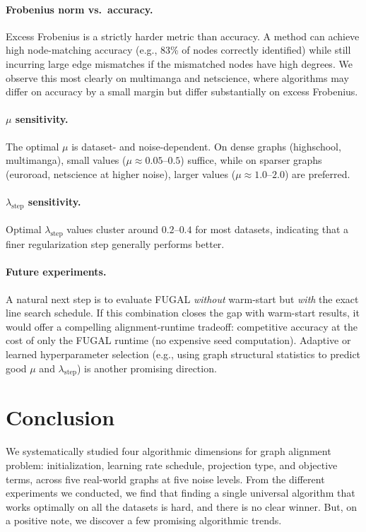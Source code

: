 \documentclass[11pt,a4paper]{article}
\newcommand{\muval}{\mu}
\newcommand{\lams}{\lambda_{\text{step}}}
\begin{document}
\paragraph{Frobenius norm vs.\ accuracy.}
Excess Frobenius is a strictly harder metric than accuracy.  A method can achieve high node-matching accuracy (e.g., 83\% of nodes correctly identified) while still incurring large edge mismatches if the mismatched nodes have high degrees. We observe this most clearly on multimanga and netscience, where algorithms may differ on accuracy by a small margin but differ substantially on excess Frobenius.

\paragraph{$\muval$ sensitivity.}
The optimal $\muval$ is dataset- and noise-dependent.  On dense graphs (highschool, multimanga), small values ($\muval \approx 0.05$--$0.5$) suffice, while on sparser graphs (euroroad, netscience at higher noise), larger values ($\muval \approx 1.0$--$2.0$) are preferred.

\paragraph{$\lams$ sensitivity.}
Optimal $\lams$ values cluster around $0.2$--$0.4$ for most datasets, indicating that a finer regularization step generally performs better.

\paragraph{Future experiments.}
A natural next step is to evaluate FUGAL \emph{without} warm-start but \emph{with} the exact line search schedule.  If this combination closes the gap with warm-start results, it would offer a compelling alignment-runtime tradeoff: competitive accuracy at the cost of only the FUGAL runtime (no expensive seed computation).  Adaptive or learned hyperparameter selection (e.g., using graph structural statistics to predict good $\muval$ and $\lams$) is another promising direction.

\section{Conclusion}
\label{sec:conclusion}

We systematically studied four algorithmic dimensions for graph alignment problem: initialization, learning rate schedule, projection type, and objective terms, across five real-world graphs at five noise levels.
From the different experiments we conducted, we find that finding a single universal algorithm that works optimally on all the datasets is hard, and there is no clear winner. But, on a positive note, we discover a few promising algorithmic trends.
\end{document}
